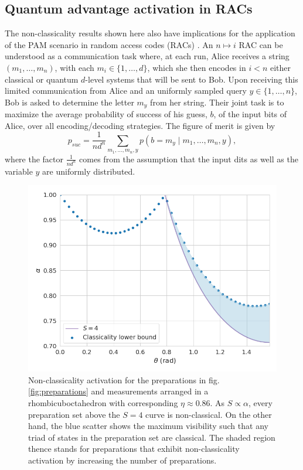 \documentclass[a4paper,preprintnumbers,floatfix,superscriptaddress,pra,twocolumn,showpacs,notitlepage,longbibliography]{revtex4-2}
\begin{document}
    \subsection{Quantum advantage activation in RACs}
    \label{sec:racs}
            
        The non-classicality results shown here also have implications for the application of the PAM scenario in random access codes (RACs) \cite{li2012semi, pawlowski-qkd-2011}. An $n \mapsto i$ RAC can be understood as a communication task where, at each run, Alice receives a string $(m_1, \dots, m_n)$, with each $m_i \in \{ 1, \ldots, d \}$, which she then encodes in $i < n$ either classical or quantum $d$-level systems that will be sent to Bob. Upon receiving this limited communication from Alice and an uniformly sampled query $y \in \{1, \ldots, n \}$, Bob is asked to determine the letter $m_y$ from her string. Their joint task is to maximize the average probability of success of his guess, $b$, of the input bits of Alice, over all encoding/decoding strategies. The figure of merit is given by
        \begin{equation}
            p_{suc} = \frac{1}{n d^n} \sum_{m_1, \ldots, m_n, y} p(b = m_y \mid m_1,\ldots, m_n, y ),
            \label{eq:psuc}
        \end{equation}
        where the factor $\frac{1}{nd^{n}}$ comes from the assumption that the input dits as well as the variable $y$ are uniformly distributed. 
        
     \begin{figure}
            \centering
            \includegraphics[width=\columnwidth]{preparation-activation.png}
            \caption{Non-classicality activation for the preparations in fig. \ref{fig:preparations} and measurements arranged in a rhombicuboctahedron with corresponding $\eta \approx 0.86$. As $S \propto \alpha$, every preparation set above the $S=4$ curve is non-classical. On the other hand, the blue scatter shows the maximum visibility such that any triad of states in the preparation set are classical. The shaded region thence stands for preparations that exhibit non-classicality activation by increasing the number of preparations.}
            \label{fig:activation}
        \end{figure}
        
\end{document}
